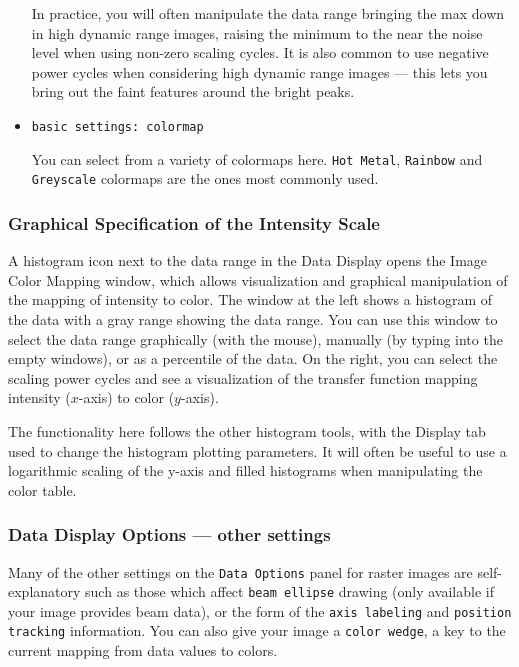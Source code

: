 \begin{itemize}
In practice, you will often manipulate the data range bringing the max down in high dynamic range images,
raising the minimum to the near the noise level when using non-zero scaling cycles. It is also common to 
use negative power cycles when considering high dynamic range images --- this lets you bring out the
faint features around the bright peaks. 

\item {\tt basic settings: colormap}

You can select from a variety of colormaps here.  {\tt Hot Metal},
{\tt Rainbow} and {\tt Greyscale} colormaps are the ones most commonly used.

\end{itemize}

\subsubsection{Graphical Specification of the Intensity Scale}

A histogram icon next to the data range in the Data Display opens the Image Color Mapping window,
which allows visualization and graphical manipulation of the mapping of intensity to color. The window
at the left shows a histogram of the data with a gray range showing the data range. You can use
this window to select the data range graphically (with the mouse), manually (by typing into the empty windows),
or as a percentile of the data. On the right, you can select the scaling power cycles and see a visualization of
the transfer function mapping intensity ($x$-axis) to color ($y$-axis). 

The functionality here follows the other histogram tools, with the Display tab used to change the histogram plotting
parameters. It will often be useful to use a logarithmic scaling of the y-axis and filled histograms when manipulating
the color table.

\subsubsection{Data Display Options --- other settings}
\label{section:display.image.raster.adjust.other}

Many of the other settings on the {\tt Data Options} panel for raster images
are self-explanatory such as those which affect {\tt beam ellipse} drawing
(only available if your image provides beam data), or the form of the
{\tt axis labeling} and {\tt position tracking} information.  You can also
give your image a {\tt color wedge}, a key to the current mapping from data
values to colors. 

